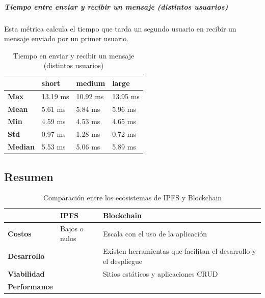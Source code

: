\subparagraph{Tiempo entre enviar y recibir un mensaje (distintos usuarios)}

Esta métrica calcula el tiempo que tarda un segundo usuario en recibir un mensaje enviado por un primer usuario.

\setlength\tabcolsep{1pt}
\begin{table}[H]
    \centering
    \begin{tabular}{|*4{m{5em}|}}
    \hline
     & \textbf{short} & \textbf{medium} & \textbf{large} \\
    \hline
    \textbf{Max} & 13.19 ms & 10.92 ms & 13.95 ms \\
    \hline
    \textbf{Mean} & 5.61 ms & 5.84 ms & 5.96 ms \\
    \hline
    \textbf{Min} & 4.59 ms & 4.53 ms & 4.65 ms \\
    \hline
    \textbf{Std} & 0.97 ms & 1.28 ms & 0.72 ms \\
    \hline
    \textbf{Median} & 5.53 ms & 5.06 ms & 5.89 ms \\
    \hline
    \end{tabular}
    \caption{Tiempo en enviar y recibir un mensaje (distintos usuarios)}
\end{table}


\subsection{Resumen}

\setlength\tabcolsep{1pt}
\begin{table}[H]
    \centering
    \begin{tabular}{||m{7em}|m{14em}|m{14em}||}
    \hline
     & \textbf{IPFS} & \textbf{Blockchain} \\
    \hline\hline
    \textbf{Costos} & Bajos o nulos & Escala con el uso de la aplicación \\
    \hline
    \textbf{Desarrollo} &  & Existen herramientas que facilitan el desarrollo y el despliegue \\
    \hline
    \textbf{Viabilidad} & & Sitios estáticos y aplicaciones CRUD \\
    \hline
    \textbf{Performance} & & \\
    \hline
    \end{tabular}
    \caption{Comparación entre los ecosistemas de IPFS y Blockchain}
\end{table}

